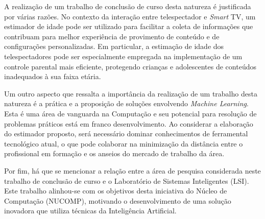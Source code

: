 A realização de um trabalho de conclusão de curso desta natureza é justificada por várias razões. No contexto da interação entre telespectador e \emph{Smart} TV, um estimador de idade pode ser utilizado para facilitar a coleta de informações que contribuam para melhor experiência de provimento de conteúdo e de configurações personalizadas. Em particular, a estimação de idade dos telespectadores pode ser especialmente empregada na implementação de um controle parental mais eficiente, protegendo crianças e adolescentes de conteúdos inadequados à sua faixa etária.

Um outro aspecto que ressalta a importância da realização de um trabalho desta natureza é a prática e a proposição de soluções envolvendo \emph{Machine Learning}. Esta é uma área de vanguarda na Computação e seu potencial para resolução de problemas práticos está em franco desenvolvimento. Ao considerar a elaboração do estimador proposto, será necessário dominar conhecimentos de ferramental tecnológico atual, o que pode colaborar na minimização da distância entre o profissional em formação e os anseios do mercado de trabalho da área.

Por fim, há que se mencionar a relação entre a área de pesquisa considerada neste trabalho de conclusão de curso e o Laboratório de Sistemas Inteligentes (LSI). Este trabalho alinhou-se com os objetivos desta iniciativa do Núcleo de Computação (NUCOMP), motivando o desenvolvimento de uma solução inovadora que utiliza técnicas da Inteligência Artificial.
